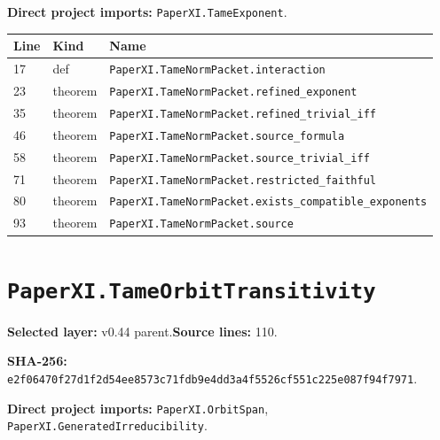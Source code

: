 \documentclass[10pt,oneside]{book}
\begin{document}

\textbf{Direct project imports:} \nolinkurl{PaperXI.TameExponent}.

\begin{longtable}{@{}p{}p{}p{}@{}}\toprule Line&Kind&Name\\\midrule\endhead

17&def&\nolinkurl{PaperXI.TameNormPacket.interaction}\\

23&theorem&\nolinkurl{PaperXI.TameNormPacket.refined_exponent}\\

35&theorem&\nolinkurl{PaperXI.TameNormPacket.refined_trivial_iff}\\

46&theorem&\nolinkurl{PaperXI.TameNormPacket.source_formula}\\

58&theorem&\nolinkurl{PaperXI.TameNormPacket.source_trivial_iff}\\

71&theorem&\nolinkurl{PaperXI.TameNormPacket.restricted_faithful}\\

80&theorem&\nolinkurl{PaperXI.TameNormPacket.exists_compatible_exponents}\\

93&theorem&\nolinkurl{PaperXI.TameNormPacket.source}\\

\bottomrule\end{longtable}

\section{\texorpdfstring{\nolinkurl{PaperXI.TameOrbitTransitivity}}{PaperXI.TameOrbitTransitivity}}\label{module:PaperXI.TameOrbitTransitivity}

\textbf{Selected layer:} v0.44 parent.\quad\textbf{Source lines:} 110.\par\textbf{SHA-256:} {\scriptsize\nolinkurl{e2f06470f27d1f2d54ee8573c71fdb9e4dd3a4f5526cf551c225e087f94f7971}}.


\textbf{Direct project imports:} \nolinkurl{PaperXI.OrbitSpan}, \nolinkurl{PaperXI.GeneratedIrreducibility}.
\end{document}
